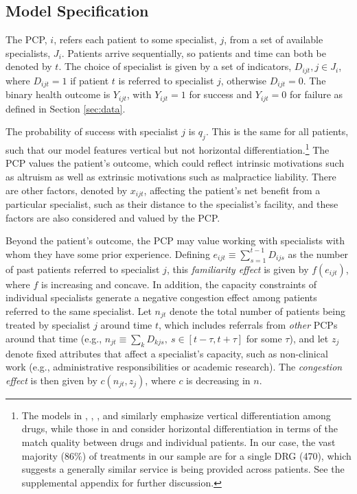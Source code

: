 \documentclass[12pt]{article}
\begin{document}
\subsection{Model Specification}
\label{sec:specification}

The PCP, $i$, refers each patient to some specialist, $j$, from a set of available specialists, $J_i$.  Patients arrive sequentially, so patients and time can both be denoted by $t$. The choice of specialist is given by a set of indicators, $D_{ijt}, j \in J_i$, where $D_{ijt} = 1$ if patient $t$ is referred to specialist $j$, otherwise $D_{ijt} = 0$. The binary health outcome is $Y_{ijt}$, with $Y_{ijt}=1$ for success and  $Y_{ijt}=0$ for failure as defined in Section \ref{sec:data}.

The probability of success with specialist $j$ is $q_j$. This is the same for all patients, such that our model features vertical but not horizontal differentiation.\footnote{The models in \cite{coscelli2004}, \cite{ching2010}, \cite{ferreyra2011}, and \cite{chan2013} similarly emphasize vertical differentiation among drugs, while those in \cite{crawford2005} and \cite{dickstein2018} consider horizontal differentiation in terms of the match quality between drugs and individual patients. In our case, the vast majority (86\%) of treatments in our sample are for a single DRG (470), which suggests a generally similar service is being provided across patients. See the supplemental appendix for further discussion.} The PCP values the patient's outcome, which could reflect intrinsic motivations such as altruism as well as extrinsic motivations such as malpractice liability. There are other factors, denoted by $x_{ijt}$, affecting the patient's net benefit from a particular specialist, such as their distance to the specialist's facility, and these factors are also considered and valued by the PCP.

Beyond the patient's outcome, the PCP may value working with specialists with whom they have some prior experience. Defining $e_{ijt} \equiv \sum_{s=1}^{t-1} D_{ijs}$ as the number of past patients referred to specialist $j$, this \emph{familiarity effect} is given by $f(e_{ijt})$, where $f$ is increasing and concave. In addition, the capacity constraints of individual specialists generate a negative congestion effect among patients referred to the same specialist. Let $n_{jt}$ denote the total number of patients being treated by specialist $j$ around time $t$, which includes referrals from \emph{other} PCPs around that time (e.g., $n_{jt} \equiv \sum_k D_{kjs}, \ s \in [t - \tau, t + \tau]$ for some $\tau$), and let $z_j$ denote fixed attributes that affect a specialist's capacity, such as non-clinical work (e.g., administrative responsibilities or academic research). The \emph{congestion effect} is then given by $c(n_{jt}, z_j)$, where $c$ is decreasing in $n$.
\end{document}
